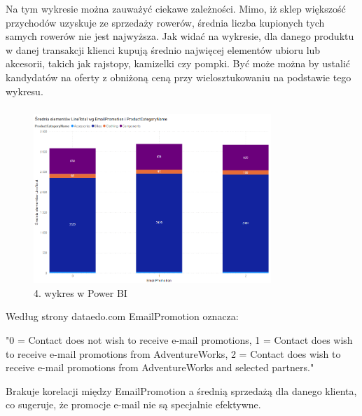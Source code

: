 \documentclass[a4paper,12pt]{article}
\begin{document}
Na tym wykresie można zauważyć ciekawe zależności. Mimo, iż sklep większość przychodów uzyskuje ze sprzedaży rowerów, średnia liczba kupionych tych samych rowerów nie jest najwyższa. Jak widać na wykresie, dla danego produktu w danej transakcji klienci kupują średnio najwięcej elementów ubioru lub akcesorii, takich jak rajstopy, kamizelki czy pompki. Być może można by ustalić kandydatów na oferty z obniżoną ceną przy wielosztukowaniu na podstawie tego wykresu.

\subsubsection{}

\begin{figure}[H]
    \centering
    \includegraphics[width=0.8\textwidth]{images/power_bi/04.png}
    \caption{4. wykres w Power BI}
\end{figure}

Według strony dataedo.com \cite{adventureworks} EmailPromotion oznacza:

"0 = Contact does not wish to receive e-mail promotions, 1 = Contact does wish to receive e-mail promotions from AdventureWorks, 2 = Contact does wish to receive e-mail promotions from AdventureWorks and selected partners."

Brakuje korelacji między EmailPromotion a średnią sprzedażą dla danego klienta, co sugeruje, że promocje e-mail nie są specjalnie efektywne. 

\subsubsection{}
\end{document}
